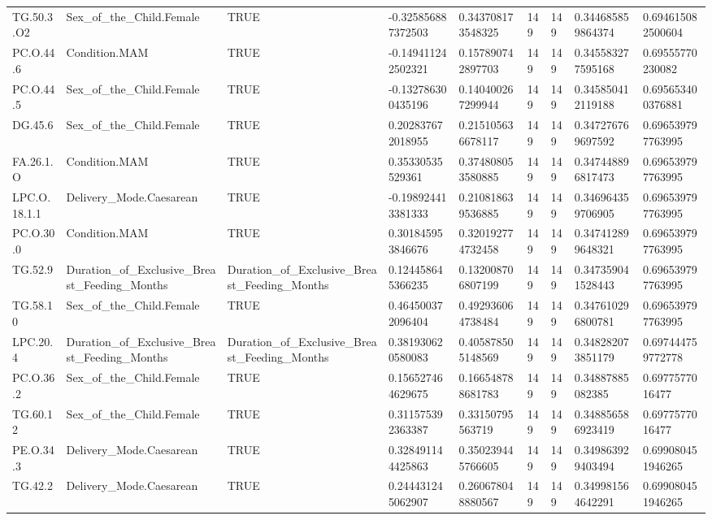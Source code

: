 \begin{longtable}{lllllllll}
TG.50.3.O2 & Sex\_of\_the\_Child.Female & TRUE & -0.325856887372503 & 0.343708173548325 & 149 & 149 & 0.344685859864374 & 0.694615082500604 \\
PC.O.44.6 & Condition.MAM & TRUE & -0.149411242502321 & 0.157890742897703 & 149 & 149 & 0.345583277595168 & 0.69555770230082 \\
PC.O.44.5 & Sex\_of\_the\_Child.Female & TRUE & -0.132786300435196 & 0.140400267299944 & 149 & 149 & 0.345850412119188 & 0.695653400376881 \\
DG.45.6 & Sex\_of\_the\_Child.Female & TRUE & 0.202837672018955 & 0.215105636678117 & 149 & 149 & 0.347276769697592 & 0.696539797763995 \\
FA.26.1.O & Condition.MAM & TRUE & 0.35330535529361 & 0.374808053580885 & 149 & 149 & 0.347448896817473 & 0.696539797763995 \\
LPC.O.18.1.1 & Delivery\_Mode.Caesarean & TRUE & -0.198924413381333 & 0.210818639536885 & 149 & 149 & 0.346964359706905 & 0.696539797763995 \\
PC.O.30.0 & Condition.MAM & TRUE & 0.301845953846676 & 0.320192774732458 & 149 & 149 & 0.347412899648321 & 0.696539797763995 \\
TG.52.9 & Duration\_of\_Exclusive\_Breast\_Feeding\_Months & Duration\_of\_Exclusive\_Breast\_Feeding\_Months & 0.124458645366235 & 0.132008706807199 & 149 & 149 & 0.347359041528443 & 0.696539797763995 \\
TG.58.10 & Sex\_of\_the\_Child.Female & TRUE & 0.464500372096404 & 0.492936064738484 & 149 & 149 & 0.347610296800781 & 0.696539797763995 \\
LPC.20.4 & Duration\_of\_Exclusive\_Breast\_Feeding\_Months & Duration\_of\_Exclusive\_Breast\_Feeding\_Months & 0.381930620580083 & 0.405878505148569 & 149 & 149 & 0.348282073851179 & 0.697444759772778 \\
PC.O.36.2 & Sex\_of\_the\_Child.Female & TRUE & 0.156527464629675 & 0.166548788681783 & 149 & 149 & 0.34887885082385 & 0.6977577016477 \\
TG.60.12 & Sex\_of\_the\_Child.Female & TRUE & 0.311575392363387 & 0.33150795563719 & 149 & 149 & 0.348856586923419 & 0.6977577016477 \\
PE.O.34.3 & Delivery\_Mode.Caesarean & TRUE & 0.328491144425863 & 0.350239445766605 & 149 & 149 & 0.349863929403494 & 0.699080451946265 \\
TG.42.2 & Delivery\_Mode.Caesarean & TRUE & 0.244431245062907 & 0.260678048880567 & 149 & 149 & 0.349981564642291 & 0.699080451946265 \\

\end{longtable}
